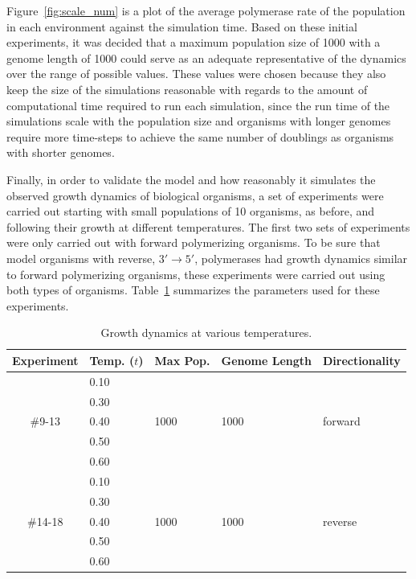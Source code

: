 Figure~\ref{fig:scale_num} is a plot of the average polymerase rate of the population in each environment against the simulation time. Based on these initial experiments, it was decided that a maximum population size of 1000 with a genome length of 1000 could serve as an adequate representative of the dynamics over the range of possible values. These values were chosen because they also keep the size of the simulations reasonable with regards to the amount of computational time required to run each simulation, since the run time of the simulations scale with the population size and organisms with longer genomes require more time-steps to achieve the same number of doublings as organisms with shorter genomes.

Finally, in order to validate the model and how reasonably it simulates the observed growth dynamics of biological organisms, a set of experiments were carried out starting with small populations of 10 organisms, as before, and following their growth at different temperatures. The first two sets of experiments were only carried out with forward polymerizing organisms. To be sure that model organisms with reverse, $3'\to5'$, polymerases had growth dynamics similar to forward polymerizing organisms, these experiments were carried out using both types of organisms. Table~\ref{tab:temp_incr} summarizes the parameters used for these experiments.

\begin{table}
	\begin{center}
		\begin{tabular}[c]{ c | l | l | l | l }
			Experiment & Temp. ($t$) & Max Pop. & Genome Length & Directionality \\
			\hline
			& 0.10 & & &\\
			& 0.30 & & &\\
			\#9-13 & 0.40 & 1000 & 1000 & forward \\
			& 0.50 & & &\\
			& 0.60 & & &\\
			\hline
			& 0.10 & & &\\
			& 0.30 & & &\\
			\#14-18 & 0.40 & 1000 & 1000 & reverse \\
			& 0.50 & & &\\
			& 0.60 & & &\\
		\end{tabular}
		\caption{Growth dynamics at various temperatures.}
		\label{tab:temp_incr}
	\end{center}
\end{table}

